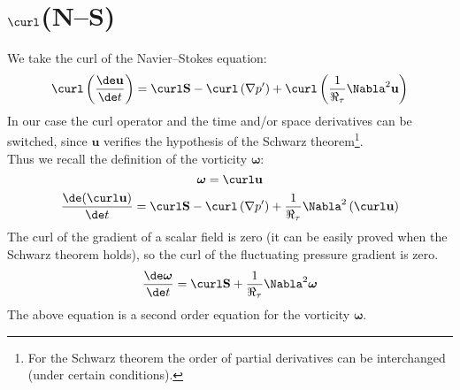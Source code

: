 \section{$\curl$(N--S)}
We take the curl of the Navier--Stokes equation:
\[
\curl\left(\frac{\de \mathbf u}{\de t}\right)=\curl\mathbf S-\curl\left(\nabla p'\right)+\curl\left(\frac{1}{\Re_\tau}\Nabla^2 \mathbf u\right)
\]
In our case the curl operator and the time and/or space derivatives can be switched, since $\mathbf u$ verifies the hypothesis of the Schwarz theorem\footnote{For the Schwarz theorem the order of partial derivatives can be interchanged (under certain conditions).}.\\
Thus we recall the definition of the vorticity $\boldsymbol \omega$:
\[
\boldsymbol \omega=\curl\mathbf u
\]
\[
\frac{\de (\curl \mathbf u)}{\de t}=\curl\mathbf S-\curl\left(\nabla p'\right)+\frac{1}{\Re_\tau}\Nabla^2\left(\curl \mathbf u\right)
\]
The curl of the gradient of a scalar field is zero (it can be easily proved when the Schwarz theorem holds), so the curl of the fluctuating pressure gradient is zero.
\begin{equation}
\frac{\de \boldsymbol \omega}{\de t}=\curl\mathbf S+\frac{1}{\Re_\tau}\Nabla^2\boldsymbol \omega
\label{eq: vor2}
\end{equation}
The above equation is a second order equation for the vorticity $\boldsymbol \omega$.

